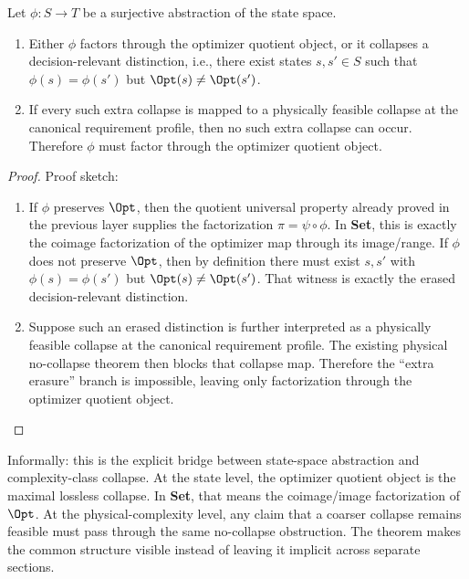 \begin{theorem}\label{thm:abstraction-boundary}
Let $\phi : S \to T$ be a surjective abstraction of the state space.

\begin{enumerate}
\item Either $\phi$ factors through the optimizer quotient object, or it collapses a decision-relevant distinction, i.e., there exist states $s,s' \in S$ such that $\phi(s)=\phi(s')$ but $\Opt(s)\neq\Opt(s')$.
\item If every such extra collapse is mapped to a physically feasible collapse at the canonical requirement profile, then no such extra collapse can occur. Therefore $\phi$ must factor through the optimizer quotient object.
\end{enumerate}
\end{theorem}

\begin{proof}
Proof sketch:
\begin{enumerate}
\item If $\phi$ preserves $\Opt$, then the quotient universal property already proved in the previous layer supplies the factorization $\pi = \psi \circ \phi$. In \textbf{Set}, this is exactly the coimage factorization of the optimizer map through its image/range. If $\phi$ does not preserve $\Opt$, then by definition there must exist $s,s'$ with $\phi(s)=\phi(s')$ but $\Opt(s)\neq\Opt(s')$. That witness is exactly the erased decision-relevant distinction.
\item Suppose such an erased distinction is further interpreted as a physically feasible collapse at the canonical requirement profile. The existing physical no-collapse theorem then blocks that collapse map. Therefore the ``extra erasure'' branch is impossible, leaving only factorization through the optimizer quotient object.
\end{enumerate}
\end{proof}

Informally: this is the explicit bridge between state-space abstraction and complexity-class collapse. At the state level, the optimizer quotient object is the maximal lossless collapse. In \textbf{Set}, that means the coimage/image factorization of $\Opt$. At the physical-complexity level, any claim that a coarser collapse remains feasible must pass through the same no-collapse obstruction. The theorem makes the common structure visible instead of leaving it implicit across separate sections.

